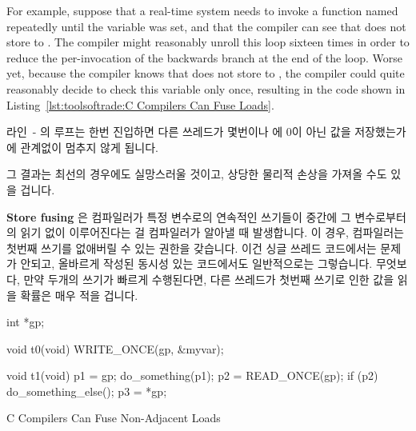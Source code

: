 {{{{For example, suppose that a real-time system needs to invoke a
function named  repeatedly until the
variable  was set, and that the compiler can see
that  does not store to .
The compiler might reasonably unroll this loop sixteen times in order
to reduce the per-invocation of the backwards branch at the end of the
loop.
Worse yet, because the compiler knows that 
does not store to , the compiler could quite reasonably
decide to check this variable only once, resulting in the code shown in
Listing~\ref{lst:toolsoftrade:C Compilers Can Fuse Loads}.
\fi
\begin{lineref}
라인~- 의 루프는 한번 진입하면 다른 쓰레드가
몇번이나  에 0이 아닌 값을 저장했는가에 관계없이 멈추지 않게
됩니다.

\end{lineref}
그 결과는 최선의 경우에도 실망스러울 것이고, 상당한 물리적 손상을 가져올 수도
있을 겁니다.

{\bf Store fusing} 은 컴파일러가 특정 변수로의 연속적인 쓰기들이 중간에 그
변수로부터의 읽기 없이 이루어진다는 걸 컴파일러가 알아낼 때 발생합니다.
이 경우, 컴파일러는 첫번째 쓰기를 없애버릴 수 있는 권한을 갖습니다.
이건 싱글 쓰레드 코드에서는 문제가 안되고, 올바르게 작성된 동시성 있는
코드에서도 일반적으로는 그렇습니다.
무엇보다, 만약 두개의 쓰기가 빠르게 수행된다면, 다른 쓰레드가 첫번째 쓰기로
인한 값을 읽을 확률은 매우 적을 겁니다.
\iffalse

\begin{listing}[tbp]
\begin{linelabel}
\begin{VerbatimL}[commandchars=\\\[\]]
int *gp; \lnlbl[gp]

void t0(void)
{
	WRITE_ONCE(gp, &myvar); \lnlbl[wgp]
}

void t1(void)
{
	p1 = gp; \lnlbl[p1]
	do_something(p1);
	p2 = READ_ONCE(gp); \lnlbl[p2]
	if (p2) { \lnlbl[if]
		do_something_else();
		p3 = *gp; \lnlbl[p3]
	}
}
\end{VerbatimL}
\end{linelabel}
\caption{C Compilers Can Fuse Non-Adjacent Loads}
\label{lst:toolsoftrade:C Compilers Can Fuse Non-Adjacent Loads}
\end{listing}

}}}}
